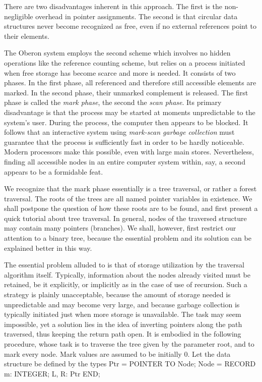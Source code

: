 There are two disadvantages inherent in this approach. The first is the non-negligible overhead in pointer assignments. The second is that circular data structures never become recognized as free, even if no external references point to their elements.

The Oberon system employs the second scheme which involves no hidden operations like the reference counting scheme, but relies on a process initiated when free storage has become scarce and more is needed. It consists of two phases. In the first phase, all referenced and therefore still accessible elements are marked. In the second phase, their unmarked complement is released. The first phase is called the \emph{mark phase}, the second the \emph{scan phase}. Its primary disadvantage is that the process may be started at moments unpredictable to the system's user. During the process, the computer then appears to be blocked. It follows that an interactive system using \emph{mark-scan garbage collection} must guarantee that the process is sufficiently fast in order to be hardly noticeable. Modern processors make this possible, even with large main stores. Nevertheless, finding all accessible nodes in an entire computer system within, say, a second appears to be a formidable feat.

We recognize that the mark phase essentially is a tree traversal, or rather a forest traversal. The roots of the trees are all named pointer variables in existence. We shall postpone the question of how these roots are to be found, and first present a quick tutorial about tree traversal. In general, nodes of the traversed structure may contain many pointers (branches). We shall, however, first restrict our attention to a binary tree, because the essential problem and its solution can be explained better in this way.

The essential problem alluded to is that of storage utilization by the traversal algorithm itself. Typically, information about the nodes already visited must be retained, be it explicitly, or implicitly as in the case of use of recursion. Such a strategy is plainly unacceptable, because the amount of storage needed is unpredictable and may become very large, and because garbage collection is typically initiated just when more storage is unavailable. The task may seem impossible, yet a solution lies in the idea of inverting pointers along the path traversed, thus keeping the return path open. It is embodied in the following procedure, whose task is to traverse the tree given by the parameter root, and to mark every node. Mark values are assumed to be initially 0. Let the data structure be defined by the types
\begintt
Ptr = POINTER TO Node;
Node = RECORD m: INTEGER; L, R: Ptr END;
\endtt

